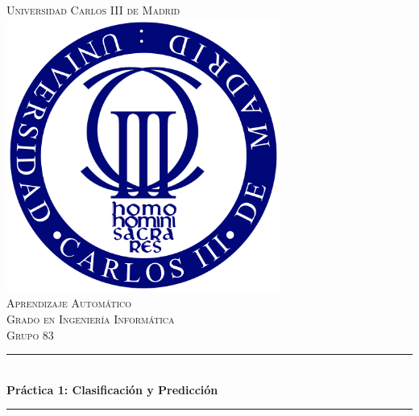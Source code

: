 \documentclass[12pt]{article}
\begin{document}
\begin{titlepage}

\newcommand{\HRule}{\rule{\linewidth}{0.5mm}} %

\center %


\textsc{\LARGE Universidad Carlos III de Madrid}\\[1.2cm] %

\includegraphics[width=9cm]{Logo}\\[1.2cm] %

\textsc{\Large Aprendizaje Automático}\\[0.5cm] %
\textsc{\large Grado en Ingeniería Informática}\\[0.6cm] %
\textsc{\large Grupo 83}\\[0.5cm]


\HRule \\[0.7cm]
{ \huge \bfseries Práctica 1: Clasificación y Predicción}\\[0.4cm] %
\HRule \\[1.3cm]


\end{titlepage}
\end{document}
